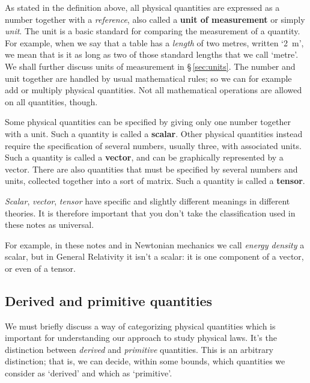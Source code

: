\documentclass[a4paper,12pt,%
onecolumn,oneside,%
british%
]{memoir}
\renewcommand*{\|}[1][]{\nonscript\:#1\vert\nonscript\:\mathopen{}}
\newcommand*{\sect}{\S}%
\begin{document}
As stated in the definition above, all physical quantities are expressed as a number together with a \emph{reference}, also called a \textbf{unit of measurement} or simply \emph{unit}. The unit is a basic standard for comparing the measurement of a quantity. For example, when we say that a table has a \emph{length} of two metres, written \enquote*{\qty{2}{m}}, we mean that is it as long as two of those standard lengths that we call \enquote*{metre}. We shall further discuss units of measurement in \sect\,\ref{sec:units}. The number and unit together are handled by usual mathematical rules; so we can for example add or multiply physical quantities. Not all mathematical operations are allowed on all quantities, though.

\medskip

Some physical quantities can be specified by giving only one number together with a unit. Such a quantity is called a \textbf{scalar}. Other physical quantities instead require the specification of several numbers, usually three, with associated units. Such a quantity is called a \textbf{vector}, and can be graphically represented by a vector. There are also quantities that must be specified by several numbers and units, collected together into a sort of matrix. Such a quantity is called a \textbf{tensor}.
\begin{warning}
  \emph{Scalar}, \emph{vector}, \emph{tensor} have specific and slightly different meanings in different theories. It is therefore important that you don't take the classification used in these notes as universal.

  \smallskip

  For example, in these notes and in Newtonian mechanics we call \emph{energy density} a scalar, but in General Relativity it isn't a scalar: it is one component of a vector, or even of a tensor.
\end{warning}


\subsection{Derived and primitive quantities}
\label{sec:derived_primitive_quant}

We must briefly discuss a way of categorizing physical quantities which is important for understanding our approach to study physical laws. It's the distinction between \emph{derived} and \emph{primitive} quantities. This is an arbitrary distinction; that is, we can decide, within some bounds, which quantities we consider as \enquote*{derived} and which as \enquote*{primitive}.
\end{document}
